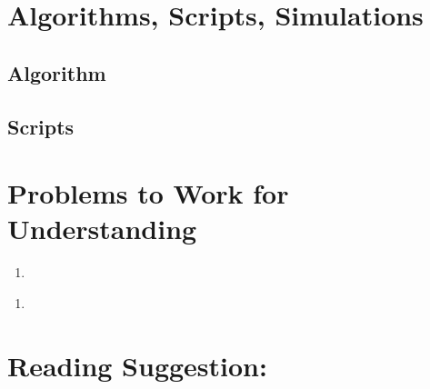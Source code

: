 \documentclass[12pt]{article}
\begin{document}
\nocite{}
\nocite{}

\hr

\section*{Algorithms, Scripts, Simulations}

\subsection*{Algorithm}

\subsection*{Scripts}



\hr

\section*{Problems to Work for Understanding}
\renewcommand{\theexerciseseries}{}
\renewcommand{\theexercise}{\arabic{exercise}}

\begin{exercise}

\end{exercise}
\begin{solution}

\end{solution}
\begin{exercise}
    \begin{enumerate}[label=(\alpha*)]
    \item
\end{enumerate}
\end{exercise}
\begin{solution}
    \begin{enumerate}[label=(\alpha*)]
    \item
\end{enumerate}
\end{solution}

\hr

\section*{Reading Suggestion:}
\end{document}
